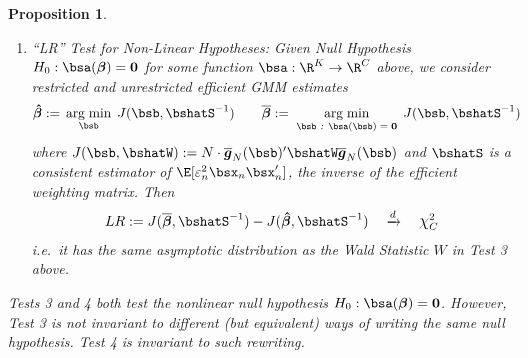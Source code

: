 \documentclass[12pt]{article}
\theoremstyle{plain}
\newtheorem{prop}[thm]{Proposition}
\theoremstyle{definition}
\theoremstyle{remark}
\newcommand*{\Chi}{\mbox{\large$\chi$}} %
\newcommand{\ra}{\rightarrow}
\newcommand{\bsbeta}{\boldsymbol{\beta}}
\newcommand{\bshatbeta}{\boldsymbol{\hat{\beta}}}
\newcommand{\bsbarbeta}{\boldsymbol{\overline{\beta}}}
\newcommand{\bsbarg}{\boldsymbol{\overline{g}}}
\renewcommand{\bso}{\boldsymbol{0}}
\DeclareMathOperator*{\argmin}{arg\;min}
\newcommand{\dto}{\xrightarrow{d}}
\begin{document}
\begin{prop}
\begin{enumerate}
  \item \emph{``LR'' Test for Non-Linear Hypotheses}:
    Given Null Hypothesis $H_0: \bsa(\bsbeta) = \bso$ for some function
    $\bsa:\R^K\ra \R^C$ above,  we consider restricted and unrestricted
    efficient GMM estimates
    \begin{align*}
      \bshatbeta
      :=&\; \argmin_{\bsb}\; J(\bsb, \bshatS^{-1})
      \qquad
      \bsbarbeta
      :=\; \argmin_{\text{$\bsb$ \emph{:} $\bsa(\bsb) = \bso$}}\;
      J(\bsb, \bshatS^{-1})
    \end{align*}
    where
    $J(\bsb, \bshatW) := N\cdot \bsbarg_N(\bsb)' \bshatW \bsbarg_N(\bsb)$
    and $\bshatS$ is a consistent estimator
    of $\E[\varepsilon_n^2\bsx_n\bsx_n']$, the inverse of the efficient
    weighting matrix. Then
    \begin{align*}
      LR := J(\bsbarbeta, \bshatS^{-1}) - J(\bshatbeta, \bshatS^{-1})
      \quad \dto \quad \Chi^2_C
    \end{align*}
    i.e.\ it has the same asymptotic distribution as the Wald Statistic
    $W$ in Test 3 above.
\end{enumerate}
Tests 3 and 4 both test the nonlinear null hypothesis
$H_0:\bsa(\bsbeta)=\bso$. However, Test 3 is \emph{not} invariant to
different (but equivalent) ways of writing the same null hypothesis.
Test 4 \emph{is} invariant to such rewriting.
\end{prop}
\end{document}

